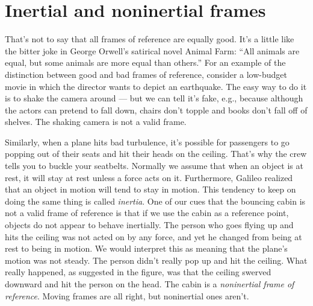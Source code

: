 \vfill\pagebreak

\section{Inertial and noninertial frames}

That's not to say that all frames of reference are equally good. It's a little like the bitter joke
in George Orwell's satirical novel Animal Farm: ``All animals are equal, but some animals are more equal than others.''
For an example of the distinction between good and bad frames of reference, consider a low-budget movie in which
the director wants to depict an earthquake.
The easy way to do it is to shake the camera around --- but we can tell it's fake,
e.g., because although the actors can pretend to fall down, chairs don't topple and books don't fall off of shelves.
The shaking camera is not a valid frame.

\begin{figure}[h]\label{fig:plane-noninertial}
\end{figure}

Similarly, when a plane hits bad turbulence, it's possible for passengers to go popping out of their seats and hit their
heads on the ceiling. That's why the crew tells you to buckle your seatbelts. Normally we assume that when an
object is at rest, it will stay at rest unless a force acts on it. Furthermore, Galileo realized that
an object in motion will tend
to stay in motion. This tendency to keep on doing the same thing is called \emph{inertia}.
One of our cues that the bouncing cabin is not a valid frame of reference is that if we use the cabin as a
reference point, objects do not appear to behave inertially. The person who goes flying up and hits the ceiling
was not acted on by any force, and yet he changed from being at rest to being in motion. We would interpret this
as meaning that the plane's motion was not steady. The person didn't really pop up and hit the ceiling. What really
happened, as suggested in the figure, was that the ceiling swerved downward and hit the person on the head. The cabin is a \emph{noninertial frame
of reference}. Moving frames are all right, but noninertial ones aren't.
